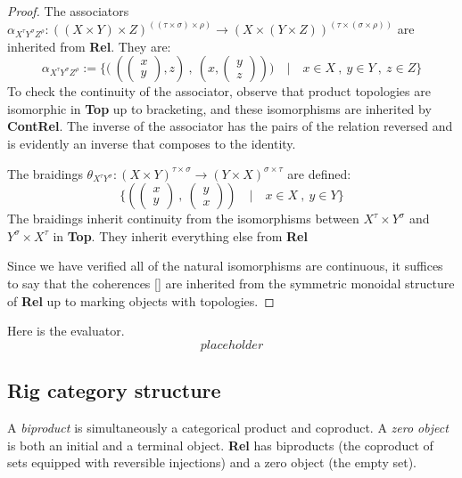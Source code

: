\begin{fullwidth}
\begin{proposition}
\begin{proof}
The associators $\alpha_{X^{\tau}Y^{\sigma}Z^{\rho}} : ((X \times Y) \times Z)^{((\tau \times \sigma) \times \rho)} \rightarrow (X \times (Y \times Z))^{(\tau \times (\sigma \times \rho))}$ are inherited from \textbf{Rel}. They are:
\[\alpha_{X^{\tau}Y^{\sigma}Z^{\rho}} := \{\big( \ (\begin{pmatrix} x \\ y \end{pmatrix} , z) \ , \ (x, \begin{pmatrix} y \\ z \end{pmatrix}) \big) \quad | \quad x \in X \ , \ y \in Y \ ,\ z \in Z \}\]
To check the continuity of the associator, observe that product topologies are isomorphic in \textbf{Top} up to bracketing, and these isomorphisms are inherited by \textbf{ContRel}. The inverse of the associator has the pairs of the relation reversed and is evidently an inverse that composes to the identity.

The braidings $\theta_{X^{\tau}Y^{\sigma}} : (X \times Y)^{\tau \times \sigma} \rightarrow (Y \times X)^{\sigma \times \tau}$ are defined:
\[\{(\begin{pmatrix} x \\ y \end{pmatrix} \ , \ \begin{pmatrix} y \\ x \end{pmatrix}) \quad | \quad x \in X \ , \ y \in Y  \}\]
The braidings inherit continuity from the isomorphisms between $X^\tau \times Y^\sigma$ and $Y^\sigma \times X^\tau$ in \textbf{Top}. They inherit everything else from \textbf{Rel}

Since we have verified all of the natural isomorphisms are continuous, it suffices to say that the coherences [] are inherited from the symmetric monoidal structure of \textbf{Rel} up to marking objects with topologies.
\end{proof}

Here is the evaluator.
\[placeholder\]
\end{proposition}

\subsection{Rig category structure}

\begin{defn}
A \emph{biproduct} is simultaneously a categorical product and coproduct. A \emph{zero object} is both an initial and a terminal object. \textbf{Rel} has biproducts (the coproduct of sets equipped with reversible injections) and a zero object (the empty set).
\end{defn}


\end{fullwidth}
